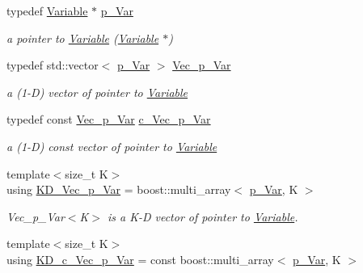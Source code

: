 \begin{DoxyCompactItemize}
typedef \mbox{\hyperlink{class_s_m_spp__di__unipi__it_1_1_variable}{Variable}} $\ast$ \mbox{\hyperlink{group___variable___t_y_p_e_s_ga85b661f10ca1c046c5f496678213981a}{p\+\_\+\+Var}}
\begin{DoxyCompactList}\small\item\em a pointer to \mbox{\hyperlink{class_s_m_spp__di__unipi__it_1_1_variable}{Variable}} (\mbox{\hyperlink{class_s_m_spp__di__unipi__it_1_1_variable}{Variable}} $\ast$) \end{DoxyCompactList}\item 
typedef std\+::vector$<$ \mbox{\hyperlink{group___variable___t_y_p_e_s_ga85b661f10ca1c046c5f496678213981a}{p\+\_\+\+Var}} $>$ \mbox{\hyperlink{group___variable___t_y_p_e_s_ga8e4a4bbc570f38e6eea262bc19e2a583}{Vec\+\_\+p\+\_\+\+Var}}
\begin{DoxyCompactList}\small\item\em a (1-\/D) vector of pointer to \mbox{\hyperlink{class_s_m_spp__di__unipi__it_1_1_variable}{Variable}} \end{DoxyCompactList}\item 
typedef const \mbox{\hyperlink{group___variable___t_y_p_e_s_ga8e4a4bbc570f38e6eea262bc19e2a583}{Vec\+\_\+p\+\_\+\+Var}} \mbox{\hyperlink{group___variable___t_y_p_e_s_gac0f024c387d6f879e3f8835d86d44bf5}{c\+\_\+\+Vec\+\_\+p\+\_\+\+Var}}
\begin{DoxyCompactList}\small\item\em a (1-\/D) const vector of pointer to \mbox{\hyperlink{class_s_m_spp__di__unipi__it_1_1_variable}{Variable}} \end{DoxyCompactList}\item 
{\footnotesize template$<$size\+\_\+t K$>$ }\\using \mbox{\hyperlink{group___variable___t_y_p_e_s_ga5f11aac4e082749e08e2013196e258a5}{K\+D\+\_\+\+Vec\+\_\+p\+\_\+\+Var}} = boost\+::multi\+\_\+array$<$ \mbox{\hyperlink{group___variable___t_y_p_e_s_ga85b661f10ca1c046c5f496678213981a}{p\+\_\+\+Var}}, K $>$
\begin{DoxyCompactList}\small\item\em Vec\+\_\+p\+\_\+\+Var$<$\+K$>$ is a K-\/D vector of pointer to \mbox{\hyperlink{class_s_m_spp__di__unipi__it_1_1_variable}{Variable}}. \end{DoxyCompactList}\item 
{\footnotesize template$<$size\+\_\+t K$>$ }\\using \mbox{\hyperlink{group___variable___t_y_p_e_s_gaae074c01b1cf2e161e8b6b8cf1044d02}{K\+D\+\_\+c\+\_\+\+Vec\+\_\+p\+\_\+\+Var}} = const boost\+::multi\+\_\+array$<$ \mbox{\hyperlink{group___variable___t_y_p_e_s_ga85b661f10ca1c046c5f496678213981a}{p\+\_\+\+Var}}, K $>$

\end{DoxyCompactItemize}
